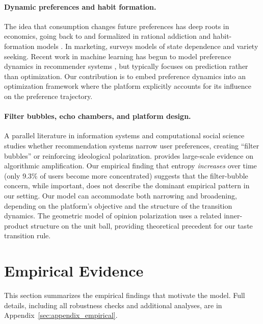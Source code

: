 \documentclass[11pt]{article}
\begin{document}
\paragraph{Dynamic preferences and habit formation.} The idea that consumption changes future preferences has deep roots in economics, going back to \citet{stigler1977gustibus} and formalized in rational addiction and habit-formation models \citep{becker1988theory}. In marketing, \citet{seetharaman2004modeling} surveys models of state dependence and variety seeking. Recent work in machine learning has begun to model preference dynamics in recommender systems \citep[e.g.,][]{krauth2020offline}, but typically focuses on prediction rather than optimization. Our contribution is to embed preference dynamics into an optimization framework where the platform explicitly accounts for its influence on the preference trajectory.

\paragraph{Filter bubbles, echo chambers, and platform design.} A parallel literature in information systems and computational social science studies whether recommendation systems narrow user preferences, creating ``filter bubbles'' \citep{pariser2011filter} or reinforcing ideological polarization. \citet{huszar2022algorithmic} provides large-scale evidence on algorithmic amplification. Our empirical finding that entropy \emph{increases} over time (only 9.3\% of users become more concentrated) suggests that the filter-bubble concern, while important, does not describe the dominant empirical pattern in our setting. Our model can accommodate both narrowing and broadening, depending on the platform's objective and the structure of the transition dynamics. The geometric model of opinion polarization \citep{hkazla2019geometric} uses a related inner-product structure on the unit ball, providing theoretical precedent for our taste transition rule.

\section{Empirical Evidence}
\label{sec:empirical}

This section summarizes the empirical findings that motivate the model. Full details, including all robustness checks and additional analyses, are in Appendix~\ref{sec:appendix_empirical}.
\end{document}
